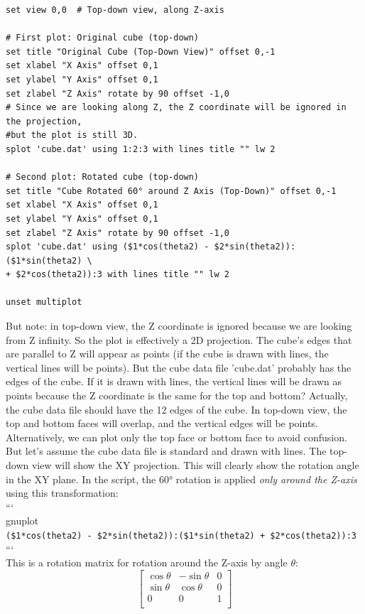 \documentclass[a4paper,10pt]{article}
\begin{document}
\begin{enumerate}
\begin{verbatim}
set view 0,0  # Top-down view, along Z-axis

# First plot: Original cube (top-down)
set title "Original Cube (Top-Down View)" offset 0,-1
set xlabel "X Axis" offset 0,1
set ylabel "Y Axis" offset 0,1
set zlabel "Z Axis" rotate by 90 offset -1,0
# Since we are looking along Z, the Z coordinate will be ignored in the projection,
#but the plot is still 3D.
splot 'cube.dat' using 1:2:3 with lines title "" lw 2

# Second plot: Rotated cube (top-down)
set title "Cube Rotated 60° around Z Axis (Top-Down)" offset 0,-1
set xlabel "X Axis" offset 0,1
set ylabel "Y Axis" offset 0,1
set zlabel "Z Axis" rotate by 90 offset -1,0
splot 'cube.dat' using ($1*cos(theta2) - $2*sin(theta2)):($1*sin(theta2) \
+ $2*cos(theta2)):3 with lines title "" lw 2

unset multiplot
\end{verbatim}
But note: in top-down view, the Z coordinate is ignored because we are looking from Z infinity. So the plot is effectively a 2D projection. The cube's edges that are parallel to Z will appear as points (if the cube is drawn with lines, the vertical lines will be points). But the cube data file 'cube.dat' probably has the edges of the cube. If it is drawn with lines, the vertical lines will be drawn as points because the Z coordinate is the same for the top and bottom? Actually, the cube data file should have the 12 edges of the cube. In top-down view, the top and bottom faces will overlap, and the vertical edges will be points.\\
Alternatively, we can plot only the top face or bottom face to avoid confusion.\\
But let's assume the cube data file is standard and drawn with lines. The top-down view will show the XY projection. This will clearly show the rotation angle in the XY plane.
In the script, the 60° rotation is applied \emph{only around the Z-axis} using this transformation:\\
```\\
gnuplot\\
\verb|($1*cos(theta2) - $2*sin(theta2)):($1*sin(theta2) + $2*cos(theta2)):3|
```\\
This is a rotation matrix for rotation around the Z-axis by angle $\theta$:\\
\[
\begin{bmatrix}
 \cos \theta&  -\sin\theta&  0\\
 \sin \theta&   \cos\theta&  0\\
  0         &     0       &  1\\

\end{bmatrix}\]
\end{enumerate}
\end{document}
